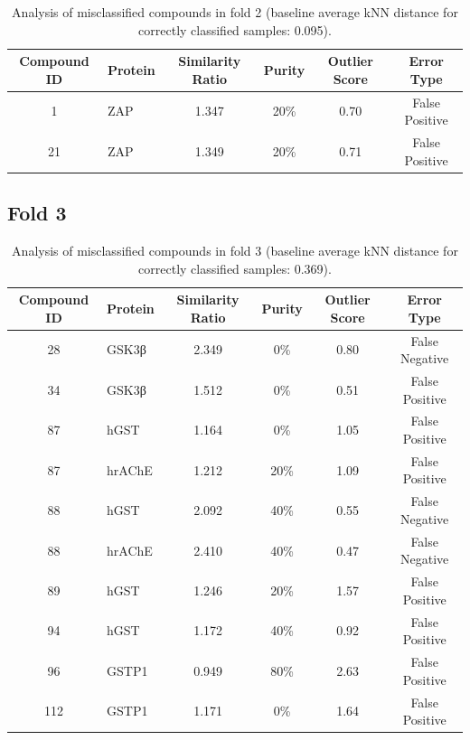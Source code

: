 \documentclass{article}
\newenvironment{smarttabular}[1]{%
    \begin{tabular}{#1}%
}{%
    \end{tabular}%
}
\begin{document}
\begin{table}[H]
    \centering
    \small
    \caption{Analysis of misclassified compounds in fold 2 (baseline average kNN distance for correctly classified samples: 0.095).}
    \label{tab:misclassified_compounds_2}
    \begin{smarttabular}{clcccc}
        \toprule
        \textbf{Compound ID} & \textbf{Protein} & \textbf{Similarity Ratio} & \textbf{Purity} & \textbf{Outlier Score} & \textbf{Error Type} \\
        \midrule
        1 & ZAP & 1.347 & 20\% & 0.70 & False Positive \\
        21 & ZAP & 1.349 & 20\% & 0.71 & False Positive \\
        \bottomrule
    \end{smarttabular}
\end{table}

\clearpage

\subsection{Fold 3}

\begin{table}[H]
    \centering
    \small
    \caption{Analysis of misclassified compounds in fold 3 (baseline average kNN distance for correctly classified samples: 0.369).}
    \label{tab:misclassified_compounds_3}
    \begin{smarttabular}{clcccc}
        \toprule
        \textbf{Compound ID} & \textbf{Protein} & \textbf{Similarity Ratio} & \textbf{Purity} & \textbf{Outlier Score} & \textbf{Error Type} \\
        \midrule
        28 & GSK3β & 2.349 & 0\% & 0.80 & False Negative \\
        34 & GSK3β & 1.512 & 0\% & 0.51 & False Positive \\
        87 & hGST & 1.164 & 0\% & 1.05 & False Positive \\
        87 & hrAChE & 1.212 & 20\% & 1.09 & False Positive \\
        88 & hGST & 2.092 & 40\% & 0.55 & False Negative \\
        88 & hrAChE & 2.410 & 40\% & 0.47 & False Negative \\
        89 & hGST & 1.246 & 20\% & 1.57 & False Positive \\
        94 & hGST & 1.172 & 40\% & 0.92 & False Positive \\
        96 & GSTP1 & 0.949 & 80\% & 2.63 & False Positive \\
        112 & GSTP1 & 1.171 & 0\% & 1.64 & False Positive \\
        \bottomrule
    \end{smarttabular}
\end{table}
\end{document}
